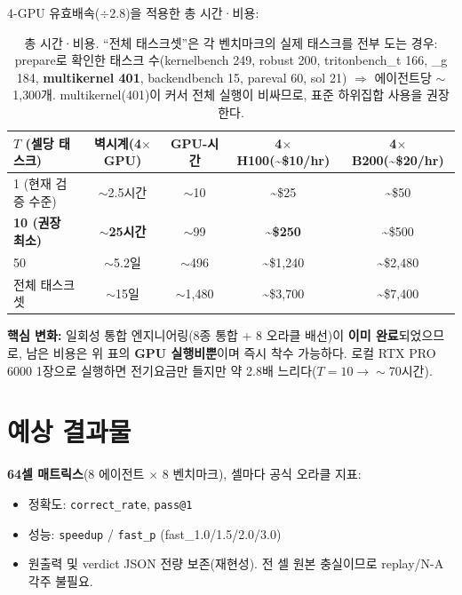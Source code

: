 \documentclass[11pt]{article}
\newcommand{\code}[1]{\texttt{\small #1}}
\begin{document}
4-GPU 유효배속($\div 2.8$)을 적용한 총 시간·비용:

\begin{table}[h]
\centering
\begin{tabular}{@{}lcccc@{}}
\toprule
\textbf{$T$ (셀당 태스크)} & \textbf{벽시계(4$\times$GPU)} & \textbf{GPU-시간} & \textbf{4$\times$H100(\textasciitilde\$10/hr)} & \textbf{4$\times$B200(\textasciitilde\$20/hr)} \\
\midrule
1 (현재 검증 수준)   & $\sim$2.5시간 & $\sim$10    & \textasciitilde\$25    & \textasciitilde\$50 \\
\textbf{10 (권장 최소)} & \textbf{$\sim$25시간} & $\sim$99 & \textbf{\textasciitilde\$250} & \textasciitilde\$500 \\
50                   & $\sim$5.2일   & $\sim$496   & \textasciitilde\$1{,}240 & \textasciitilde\$2{,}480 \\
전체 태스크셋         & $\sim$15일    & $\sim$1{,}480 & \textasciitilde\$3{,}700 & \textasciitilde\$7{,}400 \\
\bottomrule
\end{tabular}
\caption{총 시간·비용. ``전체 태스크셋''은 각 벤치마크의 실제 태스크를 전부 도는 경우:
prepare로 확인한 태스크 수(kernelbench 249, robust 200, tritonbench\_t 166, \_g 184,
\textbf{multikernel 401}, backendbench 15, pareval 60, sol 21) $\Rightarrow$ 에이전트당 $\sim$1{,}300개.
multikernel(401)이 커서 전체 실행이 비싸므로, 표준 하위집합 사용을 권장한다.}
\end{table}

\noindent\textbf{핵심 변화:} 일회성 통합 엔지니어링(8종 통합 + 8 오라클 배선)이 \textbf{이미 완료}되었으므로,
남은 비용은 위 표의 \textbf{GPU 실행비뿐}이며 즉시 착수 가능하다. 로컬 RTX PRO 6000 1장으로 실행하면
전기요금만 들지만 약 2.8배 느리다($T{=}10 \to \sim$70시간).

\section{예상 결과물}
\textbf{64셀 매트릭스}(8 에이전트 $\times$ 8 벤치마크), 셀마다 공식 오라클 지표:
\begin{itemize}
  \item 정확도: \code{correct\_rate}, \code{pass@1}
  \item 성능: \code{speedup} / \code{fast\_p} (fast\_1.0/1.5/2.0/3.0)
  \item 원출력 및 verdict JSON 전량 보존(재현성). 전 셀 원본 충실이므로 replay/N-A 각주 불필요.
\end{itemize}
\end{document}
